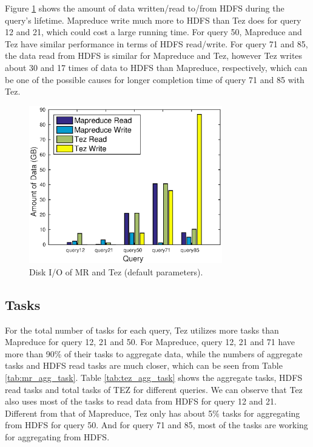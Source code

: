 \documentclass[10pt]{article}
\begin{document}
Figure \ref{fig:q1b_disk} shows the amount of data written/read to/from HDFS during the query's lifetime. Mapreduce write much more to HDFS than Tez does for query 12 and 21, which could cost a large running time. For query 50, Mapreduce and Tez have similar performance in terms of HDFS read/write. For query 71 and 85, the data read from HDFS is similar for Mapreduce and Tez, however Tez writes about 30 and 17 times of data to HDFS than Mapreduce, respectively, which can be one of the possible causes for longer completion time of query 71 and 85 with Tez.

\begin{figure}
\begin{center}
\includegraphics[width=0.75\textwidth]{pic/q1b_disk}
\caption{Disk I/O of MR and Tez (default parameters).}
\label{fig:q1b_disk}
\end{center}
\end{figure}

\subsection{Tasks}

For the total number of tasks for each query, Tez utilizes more tasks than Mapreduce for query 12, 21 and 50. For Mapreduce, query 12, 21 and 71 have more than 90\% of their tasks to aggregate data, while the numbers of aggregate tasks and HDFS read tasks are much closer, which can be seen from Table \ref{tab:mr_agg_task}. Table \ref{tab:tez_agg_task} shows the aggregate tasks, HDFS read tasks and total tasks of TEZ for different queries. We can observe that Tez also uses  most of the tasks to read data from HDFS for query 12 and 21. Different from that of Mapreduce, Tez only has about 5\% tasks for aggregating from HDFS for query 50. And for query 71 and 85, most of the tasks are working for aggregating from HDFS. 
\end{document}
